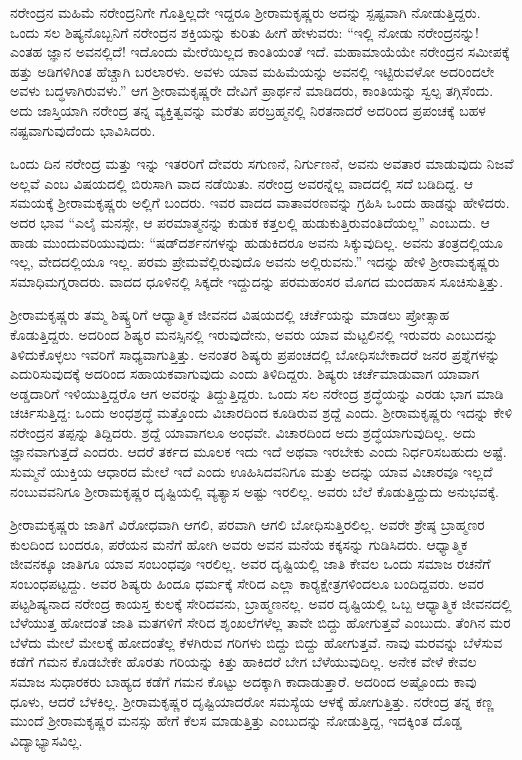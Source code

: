 ನರೇಂದ್ರನ ಮಹಿಮೆ ನರೇಂದ್ರನಿಗೇ ಗೊತ್ತಿಲ್ಲದೇ ಇದ್ದರೂ ಶ‍್ರೀರಾಮಕೃಷ್ಣರು ಅದನ್ನು ಸ್ಪಷ್ಟವಾಗಿ ನೋಡುತ್ತಿದ್ದರು. ಒಂದು ಸಲ ಶಿಷ್ಯನೊಬ್ಬನಿಗೆ ನರೇಂದ್ರನ ಶಕ್ತಿಯನ್ನು ಕುರಿತು ಹೀಗೆ ಹೇಳುವರು: “ಇಲ್ಲಿ ನೋಡು ನರೇಂದ್ರನನ್ನು! ಎಂತಹ ಜ್ಞಾನ ಅವನಲ್ಲಿದೆ! ಇದೊಂದು ಮೇರೆಯಿಲ್ಲದ ಕಾಂತಿಯಂತೆ ಇದೆ. ಮಹಾಮಾಯೆಯೇ ನರೇಂದ್ರನ ಸಮೀಪಕ್ಕೆ ಹತ್ತು ಅಡಿಗಳಿಗಿಂತ ಹೆಚ್ಚಾಗಿ ಬರಲಾರಳು. ಅವಳು ಯಾವ ಮಹಿಮೆಯನ್ನು ಅವನಲ್ಲಿ ಇಟ್ಟಿರುವಳೋ ಅದರಿಂದಲೇ ಅವಳು ಬದ್ಧಳಾಗಿರುವಳು.” ಆಗ ಶ‍್ರೀರಾಮಕೃಷ್ಣರೇ ದೇವಿಗೆ ಪ್ರಾರ್ಥನೆ ಮಾಡಿದರು, ಕಾಂತಿಯನ್ನು ಸ್ವಲ್ಪ ತಗ್ಗಿಸೆಂದು. ಅದು ಜಾಸ್ತಿಯಾಗಿ ನರೇಂದ್ರ ತನ್ನ ವ್ಯಕ್ತಿತ್ವವನ್ನು ಮರೆತು ಪರಬ್ರಹ್ಮನಲ್ಲಿ ನಿರತನಾದರೆ ಅದರಿಂದ ಪ್ರಪಂಚಕ್ಕೆ ಬಹಳ ನಷ್ಟವಾಗುವುದೆಂದು ಭಾವಿಸಿದರು.

ಒಂದು ದಿನ ನರೇಂದ್ರ ಮತ್ತು ಇನ್ನು ಇತರರಿಗೆ ದೇವರು ಸಗುಣನೆ, ನಿರ್ಗುಣನೆ, ಅವನು ಅವತಾರ ಮಾಡುವುದು ನಿಜವೆ ಅಲ್ಲವೆ ಎಂಬ ವಿಷಯದಲ್ಲಿ ಬಿರುಸಾಗಿ ವಾದ ನಡೆಯಿತು. ನರೇಂದ್ರ ಅವರನ್ನೆಲ್ಲ ವಾದದಲ್ಲಿ ಸದೆ ಬಡಿದಿದ್ದ. ಆ ಸಮಯಕ್ಕೆ ಶ‍್ರೀರಾಮಕೃಷ್ಣರು ಅಲ್ಲಿಗೆ ಬಂದರು. ಇವರ ವಾದದ ವಾತಾವರಣವನ್ನು ಗ್ರಹಿಸಿ ಒಂದು ಹಾಡನ್ನು ಹೇಳಿದರು. ಅದರ ಭಾವ “ಎಲೈ ಮನಸ್ಸೇ, ಆ ಪರಮಾತ್ಮನನ್ನು ಕುಡುಕ ಕತ್ತಲಲ್ಲಿ ಹುಡುಕುತ್ತಿರುವಂತಿದೆಯಲ್ಲ” ಎಂಬುದು. ಆ ಹಾಡು ಮುಂದುವರಿಯುವುದು: “ಷಡ್‍ದರ್ಶನಗಳನ್ನು ಹುಡುಕಿದರೂ ಅವನು ಸಿಕ್ಕುವುದಿಲ್ಲ. ಅವನು ತಂತ್ರದಲ್ಲಿಯೂ ಇಲ್ಲ, ವೇದದಲ್ಲಿಯೂ ಇಲ್ಲ. ಪರಮ ಪ್ರೇಮವೆಲ್ಲಿರುವುದೊ ಅವನು ಅಲ್ಲಿರುವನು.” ಇದನ್ನು ಹೇಳಿ ಶ‍್ರೀರಾಮಕೃಷ್ಣರು ಸಮಾಧಿಮಗ್ನರಾದರು. ವಾದದ ಧೂಳಿನಲ್ಲಿ ಸಿಕ್ಕದೇ ಇದ್ದುದನ್ನು ಪರಮಹಂಸರ ಮೊಗದ ಮಂದಹಾಸ ಸೂಚಿಸುತ್ತಿತ್ತು.

ಶ‍್ರೀರಾಮಕೃಷ್ಣರು ತಮ್ಮ ಶಿಷ್ಯ್ತರಿಗೆ ಆಧ್ಯಾತ್ಮಿಕ ಜೀವನದ ವಿಷಯದಲ್ಲಿ ಚರ್ಚೆಯನ್ನು ಮಾಡಲು ಪ್ರೋತ್ಸಾಹ ಕೊಡುತ್ತಿದ್ದರು. ಅದರಿಂದ ಶಿಷ್ಯರ ಮನಸ್ಸಿನಲ್ಲಿ ಇರುವುದೇನು, ಅವರು ಯಾವ ಮೆಟ್ಟಲಿನಲ್ಲಿ ಇರುವರು ಎಂಬುದನ್ನು ತಿಳಿದುಕೊಳ್ಳಲು ಇವರಿಗೆ ಸಾಧ್ಯವಾಗುತ್ತಿತ್ತು. ಅನಂತರ ಶಿಷ್ಯರು ಪ್ರಪಂಚದಲ್ಲಿ ಬೋಧಿಸಬೇಕಾದರೆ ಜನರ ಪ್ರಶ್ನೆಗಳನ್ನು ಎದುರಿಸುವುದಕ್ಕೆ ಅದರಿಂದ ಸಹಾಯಕವಾಗುವುದು ಎಂದು ತಿಳಿದಿದ್ದರು. ಶಿಷ್ಯರು ಚರ್ಚೆಮಾಡುವಾಗ ಯಾವಾಗ ಅಡ್ಡದಾರಿಗೆ ಇಳಿಯುತ್ತಿದ್ದರೊ ಆಗ ಅವರನ್ನು ತಿದ್ದುತ್ತಿದ್ದರು. ಒಂದು ಸಲ ನರೇಂದ್ರ ಶ್ರದ್ಧೆಯನ್ನು ಎರಡು ಭಾಗ ಮಾಡಿ ಚರ್ಚಿಸುತ್ತಿದ್ದ: ಒಂದು ಅಂಧಶ್ರದ್ಧೆ ಮತ್ತೊಂದು ವಿಚಾರದಿಂದ ಕೂಡಿರುವ ಶ್ರದ್ದೆ ಎಂದು. ಶ‍್ರೀರಾಮಕೃಷ್ಣರು ಇದನ್ನು ಕೇಳಿ ನರೇಂದ್ರನ ತಪ್ಪನ್ನು ತಿದ್ದಿದರು. ಶ್ರದ್ದೆ ಯಾವಾಗಲೂ ಅಂಧವೇ. ವಿಚಾರದಿಂದ ಅದು ಶ್ರದ್ಧೆಯಾಗುವುದಿಲ್ಲ. ಅದು ಜ್ಞಾನವಾಗುತ್ತದೆ ಎಂದರು. ಆದರೆ ತರ್ಕದ ಮೂಲಕ ಇದು ಇದೆ ಅಥವಾ ಇರಬೇಕು ಎಂದು ನಿರ್ಧರಿಸಬಹುದು ಅಷ್ಟೆ. ಸುಮ್ಮನೆ ಯುಕ್ತಿಯ ಆಧಾರದ ಮೇಲೆ ಇದೆ ಎಂದು ಊಹಿಸಿದವನಿಗೂ ಮತ್ತು ಅದನ್ನು ಯಾವ ವಿಚಾರವೂ ಇಲ್ಲದೆ ನಂಬುವವನಿಗೂ ಶ‍್ರೀರಾಮಕೃಷ್ಣರ ದೃಷ್ಟಿಯಲ್ಲಿ ವ್ಯತ್ಯಾಸ ಅಷ್ಟು ಇರಲಿಲ್ಲ. ಅವರು ಬೆಲೆ ಕೊಡುತ್ತಿದ್ದುದು ಅನುಭವಕ್ಕೆ.

ಶ‍್ರೀರಾಮಕೃಷ್ಣರು ಜಾತಿಗೆ ವಿರೋಧವಾಗಿ ಆಗಲಿ, ಪರವಾಗಿ ಆಗಲಿ ಬೋಧಿಸುತ್ತಿರಲಿಲ್ಲ. ಅವರೇ ಶ್ರೇಷ್ಠ ಬ್ರಾಹ್ಮಣರ ಕುಲದಿಂದ ಬಂದರೂ, ಪರೆಯನ ಮನೆಗೆ ಹೋಗಿ ಅವರು ಅವನ ಮನೆಯ ಕಕ್ಕಸನ್ನು ಗುಡಿಸಿದರು. ಆಧ್ಯಾತ್ಮಿಕ ಜೀವನಕ್ಕೂ ಜಾತಿಗೂ ಯಾವ ಸಂಬಂಧವೂ ಇರಲಿಲ್ಲ. ಅವರ ದೃಷ್ಟಿಯಲ್ಲಿ ಜಾತಿ ಕೇವಲ ಒಂದು ಸಮಾಜ ರಚನೆಗೆ ಸಂಬಂಧಪಟ್ಟದ್ದು. ಅವರ ಶಿಷ್ಯರು ಹಿಂದೂ ಧರ್ಮಕ್ಕೆ ಸೇರಿದ ಎಲ್ಲಾ ಕಾರ‍್ಯಕ್ಷೇತ್ರಗಳಿಂದಲೂ ಬಂದಿದ್ದವರು. ಅವರ ಪಟ್ಟಶಿಷ್ಯನಾದ ನರೇಂದ್ರ ಕಾಯಸ್ತ ಕುಲಕ್ಕೆ ಸೇರಿದವನು, ಬ್ರಾಹ್ಮಣನಲ್ಲ. ಅವರ ದೃಷ್ಟಿಯಲ್ಲಿ ಒಬ್ಬ ಆಧ್ಯಾತ್ಮಿಕ ಜೀವನದಲ್ಲಿ ಬೆಳೆಯುತ್ತ ಹೋದಂತೆ ಜಾತಿ ಮತಗಳಿಗೆ ಸೇರಿದ ಶೃಂಖಲೆಗಳೆಲ್ಲ ತಾವೇ ಬಿದ್ದು ಹೋಗುತ್ತವೆ ಎಂಬುದು. ತೆಂಗಿನ ಮರ ಬೆಳೆದು ಮೇಲೆ ಮೇಲಕ್ಕೆ ಹೋದಂತೆಲ್ಲ ಕೆಳಗಿರುವ ಗರಿಗಳು ಬಿದ್ದು ಬಿದ್ದು ಹೋಗುತ್ತವೆ. ನಾವು ಮರವನ್ನು ಬೆಳೆಸುವ ಕಡೆಗೆ ಗಮನ ಕೊಡಬೇಕೇ ಹೊರತು ಗರಿಯನ್ನು ಕಿತ್ತು ಹಾಕಿದರೆ ಬೇಗ ಬೆಳೆಯುವುದಿಲ್ಲ. ಅನೇಕ ವೇಳೆ ಕೇವಲ ಸಮಾಜ ಸುಧಾರಕರು ಬಾಹ್ಯದ ಕಡೆಗೆ ಗಮನ ಕೊಟ್ಟು ಅದಕ್ಕಾಗಿ ಕಾದಾಡುತ್ತಾರೆ. ಅದರಿಂದ ಅಷ್ಟೊಂದು ಕಾವು ಧೂಳು, ಆದರೆ ಬೆಳಕಿಲ್ಲ. ಶ‍್ರೀರಾಮಕೃಷ್ಣರ ದೃಷ್ಟಿಯಾದರೋ ಸಮಸ್ಯೆಯ ಆಳಕ್ಕೆ ಹೋಗುತ್ತಿತ್ತು. ನರೇಂದ್ರ ತನ್ನ ಕಣ್ಣ ಮುಂದೆ ಶ‍್ರೀರಾಮಕೃಷ್ಣರ ಮನಸ್ಸು ಹೇಗೆ ಕೆಲಸ ಮಾಡುತ್ತಿತ್ತು ಎಂಬುದನ್ನು ನೋಡುತ್ತಿದ್ದ, ಇದಕ್ಕಿಂತ ದೊಡ್ಡ ವಿದ್ಯಾಭ್ಯಾಸವಿಲ್ಲ.

